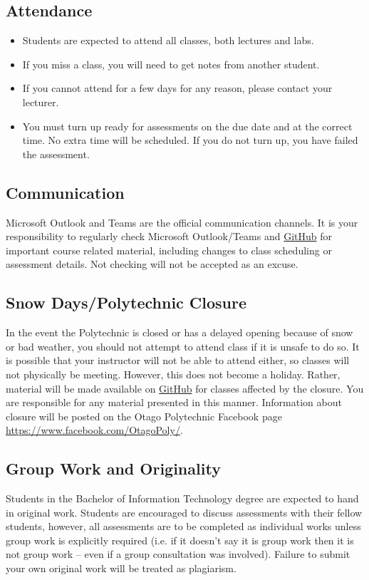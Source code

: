 \documentclass{article}
\begin{document}
\subsection*{Attendance}
\begin{itemize}
	\item Students are expected to attend all classes, both lectures and labs.
	\item If you miss a class, you will need to get notes from another student.
	\item If you cannot attend for a few days for any reason, please contact your lecturer.
	\item You must turn up ready for assessments on the due date and at the correct time. No extra time will be scheduled. If you do not turn up, you have failed the assessment.
\end{itemize}

\subsection*{Communication}
Microsoft Outlook and Teams are the official communication channels. It is your responsibility to regularly check Microsoft Outlook/Teams and \href{https://github.com/Grayson-Orr/Course-Files}{GitHub} for important course related material, including changes to class scheduling or assessment details. Not checking will not be accepted as an excuse.

\subsection*{Snow Days/Polytechnic Closure}
In the event the Polytechnic is closed or has a delayed opening because of snow or bad weather, you should not attempt to attend class if it is unsafe to do so. It is possible that your instructor will not be able to attend either, so classes will not physically be meeting. However, this does not become a holiday. Rather, material will be made available on \href{https://github.com/Grayson-Orr/Course-Files}{GitHub} for classes affected by the closure. You are responsible for any material presented in this manner. Information about closure will be posted on the Otago Polytechnic Facebook page \href{https://www.facebook.com/OtagoPoly/}{https://www.facebook.com/OtagoPoly/}.

\subsection*{Group Work and Originality}
Students in the Bachelor of Information Technology degree are expected to hand in original work. Students are encouraged to discuss assessments with their fellow students, however, all assessments are to be completed as individual works unless group work is explicitly required (i.e. if it doesn’t say it is group work then it is not group work – even if a group consultation was involved). Failure to submit your own original work will be treated as plagiarism.
\end{document}
